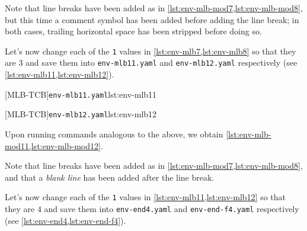 		Note that line breaks have been added as in \cref{lst:env-mlb-mod7,lst:env-mlb-mod8}, but
		this time a comment symbol has been added before adding the line break; in both cases,
		trailing horizontal space has been stripped before doing so.

		Let's%
		 now change each of the \texttt{1} values in
		\cref{lst:env-mlb7,lst:env-mlb8} so that they are $3$ and save them into
		\texttt{env-mlb11.yaml} and \texttt{env-mlb12.yaml} respectively (see
		\cref{lst:env-mlb11,lst:env-mlb12}).

		\begin{minipage}{.49\textwidth}
			{\texttt{env-mlb11.yaml}}{lst:env-mlb11}
		\end{minipage}
		\hfill
		\begin{minipage}{.49\textwidth}
			{\texttt{env-mlb12.yaml}}{lst:env-mlb12}
		\end{minipage}

		Upon running commands analogous to the above, we obtain
		\cref{lst:env-mlb-mod11,lst:env-mlb-mod12}.

		\begin{widepage}
			\begin{minipage}{.42\linewidth}
			\end{minipage}
			\hfill
			\begin{minipage}{.57\linewidth}
			\end{minipage}
		\end{widepage}

		Note that line breaks have been added as in \cref{lst:env-mlb-mod7,lst:env-mlb-mod8}, and
		that a \emph{blank line} has been added after the line break.

		Let's now change%
		 each of the \texttt{1} values in
		\cref{lst:env-mlb11,lst:env-mlb12} so that they are $4$ and save them into
		\texttt{env-end4.yaml} and \texttt{env-end-f4.yaml} respectively (see
		\cref{lst:env-end4,lst:env-end-f4}).

